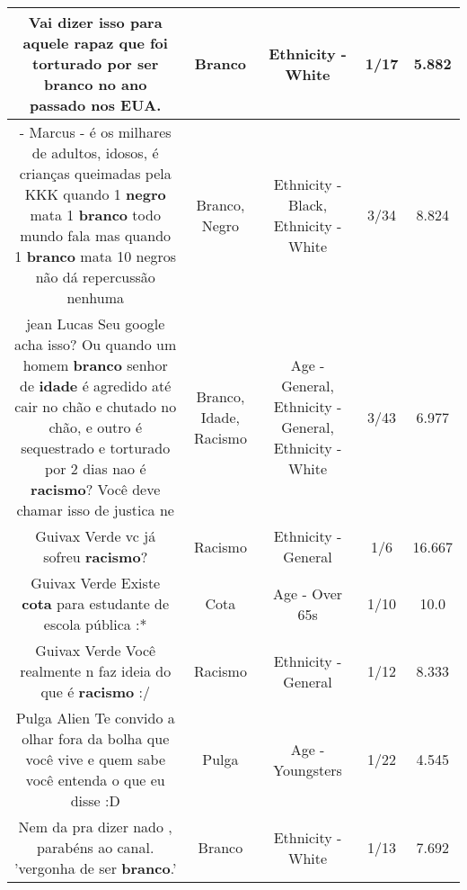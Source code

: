 \documentclass[11pt]{article}
\newlength\mylength
\begin{document}
\begin{center}
\begin{longtable}{|C{.65\mylength}|C{.30\mylength}|C{.12\mylength}|C{.12\mylength}|C{.12\mylength}|}
  \small Vai dizer isso para aquele rapaz que foi torturado por ser \textbf{branco} no ano passado nos EUA.\normalsize   & Branco & Ethnicity - White & 1/17 & 5.882 \\  \hline
  \small \@- Marcus - é os milhares de adultos, idosos, é crianças queimadas pela KKK quando 1 \textbf{negro} mata 1 \textbf{branco} todo mundo fala mas quando 1 \textbf{branco} mata 10 negros não dá repercussão nenhuma\normalsize   & Branco, Negro & Ethnicity - Black, Ethnicity - White & 3/34 & 8.824 \\  \hline
  \small jean Lucas Seu google acha isso? Ou quando um homem \textbf{branco} senhor de \textbf{idade} é agredido até cair no chão e chutado no chão, e outro é sequestrado e torturado por 2 dias nao é \textbf{racismo}? Você deve chamar isso de justica ne\normalsize   & Branco, Idade, Racismo & Age - General, Ethnicity - General, Ethnicity - White & 3/43 & 6.977 \\  \hline
  \small Guivax Verde vc já sofreu \textbf{racismo}?\normalsize   & Racismo & Ethnicity - General & 1/6 & 16.667 \\  \hline
  \small Guivax Verde Existe \textbf{cota} para estudante de escola pública :*\normalsize   & Cota & Age - Over 65s & 1/10 & 10.0 \\  \hline
  \small Guivax Verde Você realmente n faz ideia do que é \textbf{racismo} :/\normalsize   & Racismo & Ethnicity - General & 1/12 & 8.333 \\  \hline
  \small Pulga Alien Te convido a olhar fora da bolha que você vive e quem sabe você entenda o que eu disse :D\normalsize   & Pulga & Age - Youngsters & 1/22 & 4.545 \\  \hline
  \small Nem da pra dizer nado ,  parabéns  ao canal.  'vergonha de ser \textbf{branco}.'\normalsize   & Branco & Ethnicity - White & 1/13 & 7.692 \\  \hline

\end{longtable}
\end{center}
\end{document}
